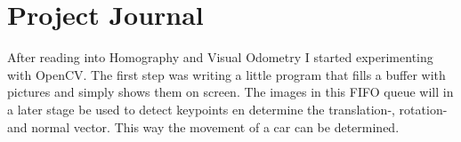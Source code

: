 \chapter{Project Journal}

After reading into Homography and Visual Odometry I started experimenting with OpenCV. The first step was writing a little program that fills a buffer with pictures and simply shows them on screen. The images in this FIFO queue will in a later stage be used to detect keypoints en determine the translation-, rotation- and normal vector. This way the movement of a car can be determined.